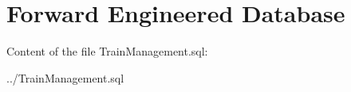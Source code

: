 \section{Forward Engineered Database}

Content of the file TrainManagement.sql:


{../TrainManagement.sql}
